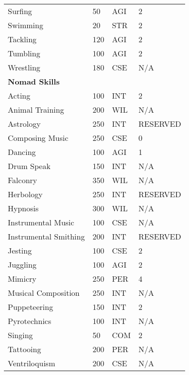 \begin{normbox}
\begin{tabularx}{\linewidth}{@{} l X X X }
Surfing & 50 & AGI & 2 \\
Swimming & 20 & STR & 2 \\
Tackling & 120 & AGI & 2 \\
Tumbling & 100 & AGI & 2 \\
Wrestling & 180 & CSE & N/A \\
\midrule
\textbf{Nomad Skills} &  & & \\
Acting & 100 & INT & 2 \\
Animal Training & 200 & WIL & N/A \\
Astrology & 250 & INT & RESERVED \\
Composing Music & 250 & CSE & 0 \\
Dancing & 100 & AGI & 1 \\
Drum Speak & 150 & INT & N/A \\
Falconry & 350 & WIL & N/A \\
Herbology & 250 & INT & RESERVED \\
Hypnosis & 300 & WIL & N/A \\
Instrumental Music & 100 & CSE & N/A \\
Instrumental Smithing & 200 & INT & RESERVED \\
Jesting & 100 & CSE & 2 \\
Juggling & 100 & AGI & 2 \\
Mimicry & 250 & PER & 4 \\
Musical Composition & 250 & INT & N/A \\
Puppeteering & 150 & INT & 2 \\
Pyrotechnics & 100 & INT & N/A \\
Singing & 50 & COM & 2 \\
Tattooing & 200 & PER & N/A \\
Ventriloquism & 200 & CSE & N/A \\
\end{tabularx}
\end{normbox}





